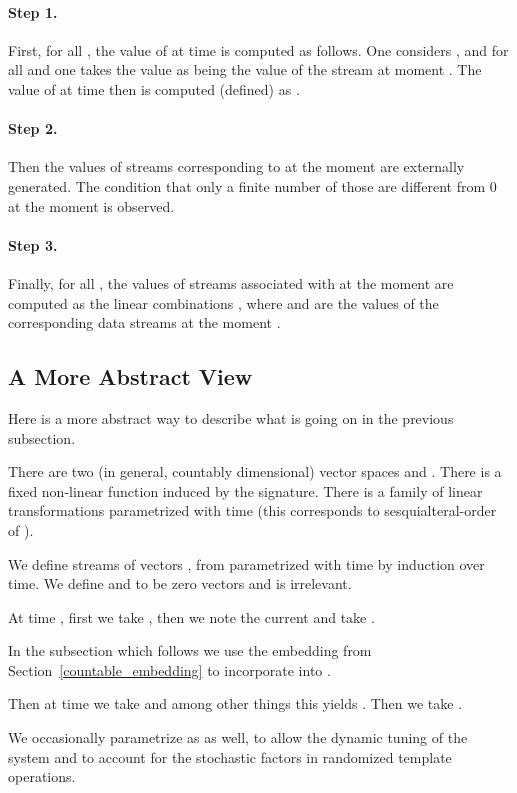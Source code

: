 \documentclass[withtimes]{easychair}
\begin{document}
\paragraph{Step 1.} First, for all , the value of  at time  is computed as follows.
One considers , and for all   and  one
takes the value  as being the value of the stream  at moment .
The value of  at time  then is computed (defined) as .

\paragraph{Step 2.} Then the values of streams corresponding to  at the moment  are externally generated.
The condition that only a finite number of those are different from 0 at the moment  is observed.

\paragraph{Step 3.} Finally, for all , the values of streams associated with  at the moment  are computed as the linear
combinations , where  and  are the values of the corresponding
data streams at the moment .

\subsection{A More Abstract View}

Here is a more abstract way to describe what is going on in the previous subsection.

There are two (in general, countably dimensional) vector spaces  and . There is
a fixed non-linear function  induced by the signature. There is
a family of linear transformations  parametrized with time
(this corresponds to sesquialteral-order of ).

We define streams of vectors ,  from  parametrized with time by induction over time.
We define  and  to be zero vectors and  is irrelevant.

At time , first we take , then we note the current
 and take .

In the subsection which follows we use the embedding from Section~\ref{countable_embedding}
to incorporate  into .

Then at time  we take  and among other things this yields .
Then we take . 

We occasionally parametrize  as  as well, to allow the dynamic tuning of the system
and to account for the stochastic factors in randomized template operations.
\end{document}
